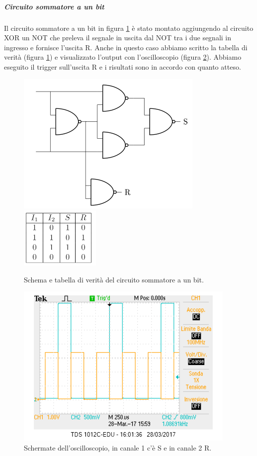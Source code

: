 \documentclass[10pt,a4paper]{article}
\begin{document}
\subparagraph{Circuito sommatore a un bit}
Il circuito sommatore a un bit in figura \ref{fig:sommatore} è stato montato aggiungendo al circuito XOR un NOT che preleva il segnale in uscita dal NOT tra i due segnali in ingresso e fornisce l'uscita R. Anche in questo caso abbiamo scritto la tabella di verità (figura \ref{fig:sommatore}) e visualizzato l'output con l'oscilloscopio (figura \ref{osc:sommatore}). Abbiamo eseguito il trigger sull'uscita R e i risultati sono in accordo con quanto atteso.



\begin{figure}[!htb]
  \centering
  \includegraphics[scale=0.7]{sommatore.png}\includegraphics[scale=0.8]{tabSOMMATORE.png}
\caption{Schema e tabella di verità del circuito sommatore a un bit.\label{fig:sommatore}}
\end{figure}

\begin{figure}[!htb]
  \centering
  \includegraphics[scale=0.75]{sommatoreRS.png}
\caption{Schermate dell'oscilloscopio, in canale 1 c'è S e in canale 2 R.\label{osc:sommatore}}
\end{figure}
\end{document}
